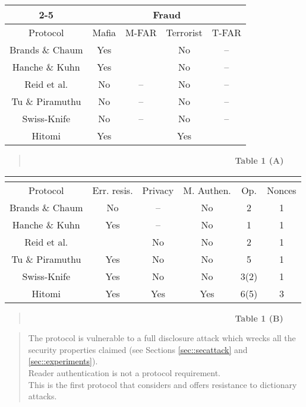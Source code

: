 \documentclass{article}
\begin{document}
\begin{table*}
  \centering
  \caption{Performance Comparison of distance bounding protocols}\label{table::pcomparison}
\begin{scriptsize}
\begin{tabular}{|c|c|c|c|c|}
  \cline{2-5}
  \multicolumn{1}{c}{} & \multicolumn{4}{|c|}{Fraud} \\ \hline
Protocol & Mafia & M-FAR & Terrorist & T-FAR  \\ \hline
  Brands \& Chaum \cite{brands94} & Yes &  & No & --  \\ \hline
  Hanche \& Kuhn \cite{hancke05} & Yes &  & No & --  \\ \hline
  Reid et al. \cite{reid2007} & No & -- & No & -- \\ \hline
  Tu \& Piramuthu \cite{TuP-2007-rfidtechnology}  & No & -- & No & --  \\ \hline
  Swiss-Knife \cite{KimAKSP-2008-icisc} & No & -- & No & -- \\ \hline
  Hitomi  & Yes &  & Yes &  \\
  \hline
\end{tabular}
\begin{quote}
   ~~~~~~~~~~~~~~~~~~~~~~~~~~~~~~~~~~~~~~~~~~~~~~~~~ \textbf{Table 1 (A)}
\end{quote}


\begin{tabular}{|c|c|c|c|c|c|}
\multicolumn{1}{c}{}&   \multicolumn{5}{c}{} \\ \hline
Protocol & Err. resis. & Privacy & M. Authen. &  Op. &  Nonces   \\ \hline
  Brands \& Chaum \cite{brands94} &  No &  -- & No & 2 & 1 \\ \hline
  Hanche \& Kuhn \cite{hancke05} & Yes &  -- & No & 1 & 1 \\ \hline
  Reid et al. \cite{reid2007} & &  No & No & 2 & 1 \\ \hline
  Tu \& Piramuthu \cite{TuP-2007-rfidtechnology}  &  Yes &  No & No & 5 & 1 \\ \hline
  Swiss-Knife \cite{KimAKSP-2008-icisc} & Yes &  No & No & 3(2) & 1\\ \hline
  Hitomi  & Yes &  Yes & Yes & 6(5) & 3\\
  \hline
\end{tabular}
\begin{quote}
   ~~~~~~~~~~~~~~~~~~~~~~~~~~~~~~~~~~~~~~~~~~~~~~~~~ \textbf{Table 1 (B)}
\end{quote}

\begin{quote}
      The protocol is vulnerable to a full disclosure attack which wrecks all the security properties claimed (see Sections \ref{sec::secattack} and \ref{sec::experiments}). \\
     Reader authentication is not a protocol requirement.   \\
     This is the first protocol that considers and offers resistance to dictionary attacks.
\end{quote}

\end{scriptsize}
\end{table*}
\end{document}
